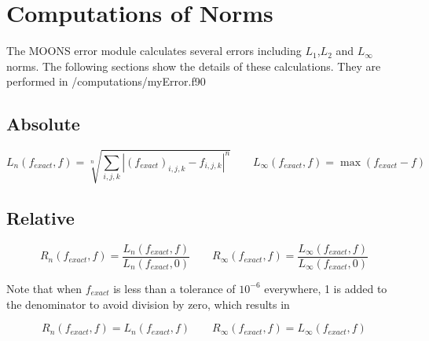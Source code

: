 \documentclass[11pt]{article}
\begin{document}
\doublespacing
\MOONSTITLE
\maketitle

\section{Computations of Norms}
The MOONS error module calculates several errors including $L_1$,$L_2$ and $L_{\infty}$ norms. The following sections show the details of these calculations. They are performed in /computations/myError.f90

\subsection{Absolute}
\begin{equation}
L_n(f_{exact},f) =  \sqrt[n]{\sum_{i,j,k} |(f_{exact})_{i,j,k} - f_{i,j,k}|^n} \qquad
L_\infty(f_{exact},f) = \max( f_{exact} - f )
\end{equation}

\subsection{Relative}
\begin{equation}
R_{n}(f_{exact},f) = \frac{L_n(f_{exact},f)}{L_n(f_{exact},0)} \qquad
R_{\infty}(f_{exact},f) = \frac{L_\infty(f_{exact},f)}{L_\infty(f_{exact},0)}
\end{equation}

Note that when $f_{exact}$ is less than a tolerance of $10^{-6}$ everywhere, 1 is added to the denominator to avoid division by zero, which results in

\begin{equation}
R_{n}(f_{exact},f) = L_n(f_{exact},f) \qquad
R_{\infty}(f_{exact},f) = L_\infty(f_{exact},f)
\end{equation}
\end{document}
